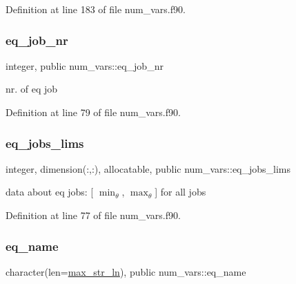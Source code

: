 Definition at line 183 of file num\+\_\+vars.\+f90.

\mbox{\label{namespacenum__vars_adfff3a032694d6c26e780019772d4cc1}} 
\subsubsection{\texorpdfstring{eq\+\_\+job\+\_\+nr}{eq\_job\_nr}}
{\footnotesize\ttfamily integer, public num\+\_\+vars\+::eq\+\_\+job\+\_\+nr}



nr. of eq job 



Definition at line 79 of file num\+\_\+vars.\+f90.

\mbox{\label{namespacenum__vars_a725aecf3a6f55fee53a5fe3b759d6a25}} 
\subsubsection{\texorpdfstring{eq\+\_\+jobs\+\_\+lims}{eq\_jobs\_lims}}
{\footnotesize\ttfamily integer, dimension(\+:,\+:), allocatable, public num\+\_\+vars\+::eq\+\_\+jobs\+\_\+lims}



data about eq jobs\+: \mbox{[} $\min_\theta$, $\max_\theta$\mbox{]} for all jobs 



Definition at line 77 of file num\+\_\+vars.\+f90.

\mbox{\label{namespacenum__vars_a3cc0fc4b1538f7203be1604cb4f7c9bc}} 
\subsubsection{\texorpdfstring{eq\+\_\+name}{eq\_name}}
{\footnotesize\ttfamily character(len=\hyperlink{namespacenum__vars_a3ff2bb983ee80a6735277d6789e6ce7c}{max\+\_\+str\+\_\+ln}), public num\+\_\+vars\+::eq\+\_\+name}



